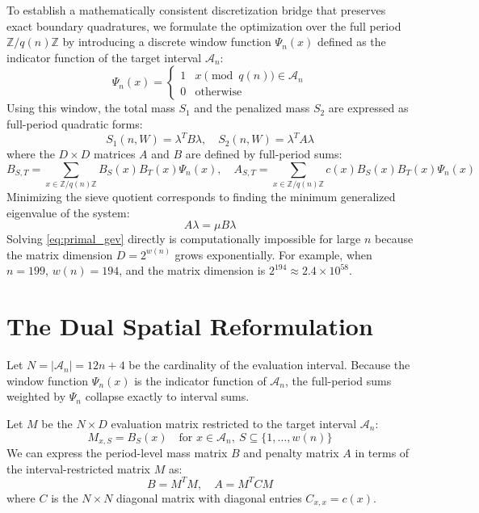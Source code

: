 \documentclass[10pt,twoside]{article}
\newcommand{\mathcalA}{\mathcal{A}}
\begin{document}
To establish a mathematically consistent discretization bridge that preserves exact boundary quadratures, we formulate the optimization over the full period $\mathbb{Z}/q(n)\mathbb{Z}$ by introducing a discrete window function $\Psi_n(x)$ defined as the indicator function of the target interval $\mathcalA_n$:
\begin{equation}
\Psi_n(x) = \begin{cases} 1 & x \pmod{q(n)} \in \mathcalA_n \\ 0 & \text{otherwise} \end{cases}
\end{equation}
Using this window, the total mass $S_1$ and the penalized mass $S_2$ are expressed as full-period quadratic forms:
\begin{equation}
S_1(n, W) = \lambda^T B \lambda, \quad S_2(n, W) = \lambda^T A \lambda
\end{equation}
where the $D \times D$ matrices $A$ and $B$ are defined by full-period sums:
\begin{equation}
B_{S, T} = \sum_{x \in \mathbb{Z}/q(n)\mathbb{Z}} B_S(x) B_T(x) \Psi_n(x), \quad A_{S, T} = \sum_{x \in \mathbb{Z}/q(n)\mathbb{Z}} c(x) B_S(x) B_T(x) \Psi_n(x)
\end{equation}
Minimizing the sieve quotient corresponds to finding the minimum generalized eigenvalue of the system:
\begin{equation} \label{eq:primal_gev}
A \lambda = \mu B \lambda
\end{equation}
Solving \eqref{eq:primal_gev} directly is computationally impossible for large $n$ because the matrix dimension $D = 2^{w(n)}$ grows exponentially. For example, when $n=199$, $w(n) = 194$, and the matrix dimension is $2^{194} \approx 2.4 \times 10^{58}$.

\section{The Dual Spatial Reformulation} \label{sec:dual}

Let $N = |\mathcalA_n| = 12n + 4$ be the cardinality of the evaluation interval. Because the window function $\Psi_n(x)$ is the indicator function of $\mathcalA_n$, the full-period sums weighted by $\Psi_n$ collapse exactly to interval sums.

Let $M$ be the $N \times D$ evaluation matrix restricted to the target interval $\mathcalA_n$:
\begin{equation}
M_{x, S} = B_S(x) \quad \text{for } x \in \mathcalA_n, \ S \subseteq \{1, \dots, w(n)\}
\end{equation}
We can express the period-level mass matrix $B$ and penalty matrix $A$ in terms of the interval-restricted matrix $M$ as:
\begin{equation}
B = M^T M, \quad A = M^T C M
\end{equation}
where $C$ is the $N \times N$ diagonal matrix with diagonal entries $C_{x, x} = c(x)$.
\end{document}
